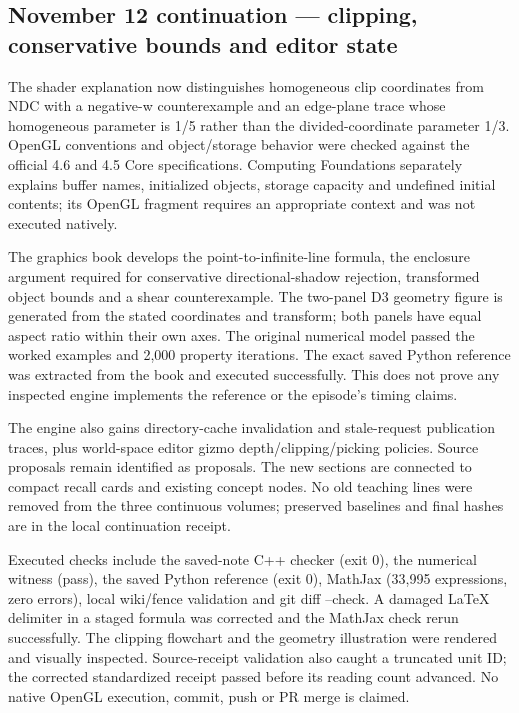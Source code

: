 \subsection{November 12 continuation --- clipping, conservative bounds and editor state}\label{appendix-a103e7846d21-november-12-continuation-clipping-conservative-bounds-and-editor-state}

\hypertarget{appendix-a103e7846d21-november-12-continuation-clipping-conservative-bounds-and-editor-state}{}

The shader explanation now distinguishes homogeneous clip coordinates from NDC with a negative-w counterexample and an edge-plane trace whose homogeneous parameter is 1/5 rather than the divided-coordinate parameter 1/3. OpenGL conventions and object/storage behavior were checked against the official 4.6 and 4.5 Core specifications. Computing Foundations separately explains buffer names, initialized objects, storage capacity and undefined initial contents; its OpenGL fragment requires an appropriate context and was not executed natively.

The graphics book develops the point-to-infinite-line formula, the enclosure argument required for conservative directional-shadow rejection, transformed object bounds and a shear counterexample. The two-panel D3 geometry figure is generated from the stated coordinates and transform; both panels have equal aspect ratio within their own axes. The original numerical model passed the worked examples and 2,000 property iterations. The exact saved Python reference was extracted from the book and executed successfully. This does not prove any inspected engine implements the reference or the episode's timing claims.

The engine also gains directory-cache invalidation and stale-request publication traces, plus world-space editor gizmo depth/clipping/picking policies. Source proposals remain identified as proposals. The new sections are connected to compact recall cards and existing concept nodes. No old teaching lines were removed from the three continuous volumes; preserved baselines and final hashes are in the local {continuation receipt}.

Executed checks include the saved-note C++ checker (exit 0), the numerical witness (pass), the saved Python reference (exit 0), MathJax (33,995 expressions, zero errors), local wiki/fence validation and git diff --check. A damaged LaTeX delimiter in a staged formula was corrected and the MathJax check rerun successfully. The clipping flowchart and the geometry illustration were rendered and visually inspected. Source-receipt validation also caught a truncated unit ID; the corrected standardized receipt passed before its reading count advanced. No native OpenGL execution, commit, push or PR merge is claimed.

